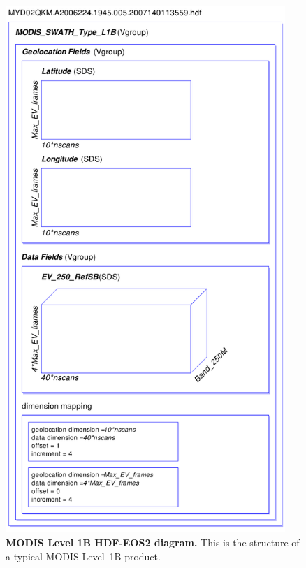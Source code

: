 \begin{figure}[p]
\includegraphics[width=300pt]{images/hdf-eos2_modis.pdf}
\caption[MODIS Level 1B HDF-EOS2 diagram]{\textbf{MODIS Level 1B HDF-EOS2 diagram.} This is the structure of a
typical MODIS Level~1B product.}
\label{fig:hdfeos2-modis}
\end{figure}
